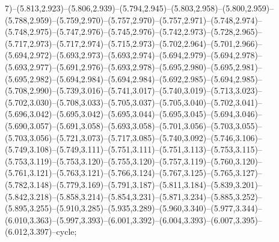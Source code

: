 7)--(5.813,2.923)--(5.806,2.939)--(5.794,2.945)--(5.803,2.958)--(5.800,2.959)--(5.788,2.959)--(5.759,2.970)--(5.757,2.970)--(5.757,2.971)--(5.748,2.974)--(5.748,2.975)--(5.747,2.976)--(5.745,2.976)--(5.742,2.973)--(5.728,2.965)--(5.717,2.973)--(5.717,2.974)--(5.715,2.973)--(5.702,2.964)--(5.701,2.966)--(5.694,2.972)--(5.693,2.973)--(5.693,2.974)--(5.694,2.979)--(5.694,2.978)--(5.693,2.977)--(5.691,2.976)--(5.693,2.978)--(5.695,2.980)--(5.695,2.981)--(5.695,2.982)--(5.694,2.984)--(5.694,2.984)--(5.692,2.985)--(5.694,2.985)--(5.708,2.990)--(5.739,3.016)--(5.741,3.017)--(5.740,3.019)--(5.713,3.023)--(5.702,3.030)--(5.708,3.033)--(5.705,3.037)--(5.705,3.040)--(5.702,3.041)--(5.696,3.042)--(5.695,3.042)--(5.695,3.044)--(5.695,3.045)--(5.694,3.046)--(5.690,3.057)--(5.691,3.058)--(5.693,3.058)--(5.701,3.056)--(5.703,3.055)--(5.703,3.056)--(5.721,3.073)--(5.717,3.085)--(5.740,3.092)--(5.746,3.106)--(5.749,3.108)--(5.749,3.111)--(5.751,3.111)--(5.751,3.113)--(5.753,3.115)--(5.753,3.119)--(5.753,3.120)--(5.755,3.120)--(5.757,3.119)--(5.760,3.120)--(5.761,3.121)--(5.763,3.121)--(5.766,3.124)--(5.767,3.125)--(5.765,3.127)--(5.782,3.148)--(5.779,3.169)--(5.791,3.187)--(5.811,3.184)--(5.839,3.201)--(5.842,3.218)--(5.858,3.214)--(5.854,3.231)--(5.871,3.234)--(5.885,3.252)--(5.895,3.255)--(5.910,3.285)--(5.935,3.289)--(5.960,3.340)--(5.977,3.344)--(6.010,3.363)--(5.997,3.393)--(6.001,3.392)--(6.004,3.393)--(6.007,3.395)--(6.012,3.397)--cycle;
